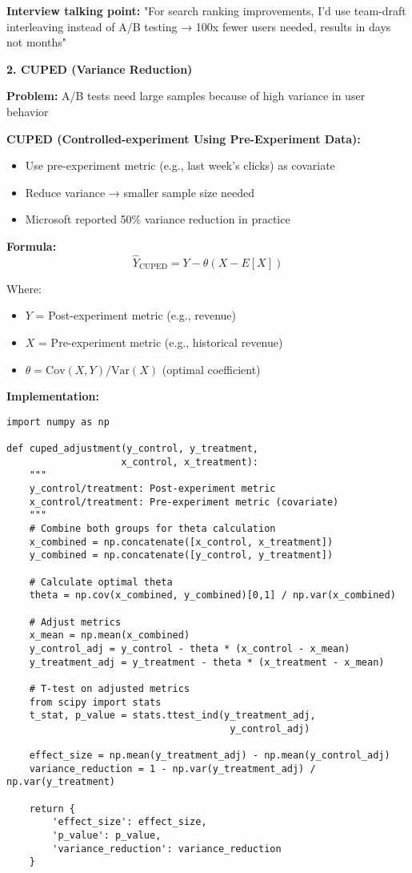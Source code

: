 \documentclass[10pt]{article}
\begin{document}
\textbf{Interview talking point:} "For search ranking improvements, I'd use team-draft interleaving instead of A/B testing → 100x fewer users needed, results in days not months"

\textbf{2. CUPED (Variance Reduction)}

\textbf{Problem:} A/B tests need large samples because of high variance in user behavior

\textbf{CUPED (Controlled-experiment Using Pre-Experiment Data):}
\begin{itemize}
\item Use pre-experiment metric (e.g., last week's clicks) as covariate
\item Reduce variance → smaller sample size needed
\item Microsoft reported 50\% variance reduction in practice
\end{itemize}

\textbf{Formula:}
$$\hat{Y}_{\text{CUPED}} = Y - \theta(X - E[X])$$

Where:
\begin{itemize}
\item $Y$ = Post-experiment metric (e.g., revenue)
\item $X$ = Pre-experiment metric (e.g., historical revenue)
\item $\theta = \text{Cov}(X,Y) / \text{Var}(X)$ (optimal coefficient)
\end{itemize}

\textbf{Implementation:}
\begin{verbatim}
import numpy as np

def cuped_adjustment(y_control, y_treatment,
                    x_control, x_treatment):
    """
    y_control/treatment: Post-experiment metric
    x_control/treatment: Pre-experiment metric (covariate)
    """
    # Combine both groups for theta calculation
    x_combined = np.concatenate([x_control, x_treatment])
    y_combined = np.concatenate([y_control, y_treatment])

    # Calculate optimal theta
    theta = np.cov(x_combined, y_combined)[0,1] / np.var(x_combined)

    # Adjust metrics
    x_mean = np.mean(x_combined)
    y_control_adj = y_control - theta * (x_control - x_mean)
    y_treatment_adj = y_treatment - theta * (x_treatment - x_mean)

    # T-test on adjusted metrics
    from scipy import stats
    t_stat, p_value = stats.ttest_ind(y_treatment_adj,
                                       y_control_adj)

    effect_size = np.mean(y_treatment_adj) - np.mean(y_control_adj)
    variance_reduction = 1 - np.var(y_treatment_adj) / np.var(y_treatment)

    return {
        'effect_size': effect_size,
        'p_value': p_value,
        'variance_reduction': variance_reduction
    }
\end{verbatim}
\end{document}
